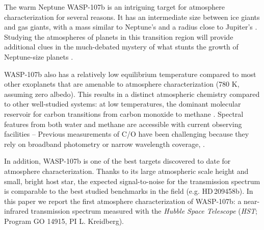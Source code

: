 \documentclass[twocolumn, trackchanges]{aastex61}
\begin{document}
The warm Neptune WASP-107b is an intriguing target for atmosphere characterization for several reasons.  It has an intermediate size between ice giants and gas giants, with a mass similar to Neptune's and a radius close to Jupiter's \citep[$0.12\,M_\mathrm{Jup}$, $0.94\,R_\mathrm{Jup}$;][]{anderson17}. Studying the atmospheres of planets in this transition region will provide additional clues in the much-debated mystery of what stunts the growth of Neptune-size planets \citep[e.g][]{pollack96, dawson16, frelikh17}.  

WASP-107b also has a relatively low equilibrium temperature compared to most other exoplanets that are amenable to atmosphere characterization (780 K, assuming zero albedo).  This results in a distinct atmospheric chemistry compared to other well-studied systems: at low temperatures, the dominant molecular reservoir for carbon transitions from carbon monoxide to methane \citep{moses13}.  Spectral features from both water and methane are accessible with current observing facilities --  Previous measurements of C/O have been challenging because they rely on broadband photometry or narrow wavelength coverage,  \citep[e.g.][]{madhusudhan11, line14, benneke15, kreidberg15b}. 

In addition, WASP-107b is one of the best targets discovered to date for atmosphere characterization. Thanks to its large atmospheric scale height and small, bright host star, the expected signal-to-noise for the transmission spectrum is comparable to the best studied benchmarks in the field (e.g. HD\,209458b).  In this paper we report the first atmosphere characterization of WASP-107b: a near-infrared transmission spectrum measured with the \emph{Hubble Space Telescope} (\emph{HST}; Program GO 14915, PI L. Kreidberg).
\end{document}

